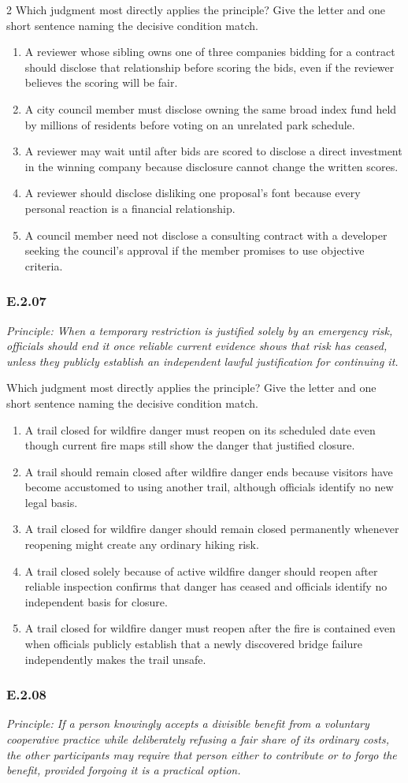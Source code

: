 \documentclass[10pt]{extarticle}
\newcommand{\choice}[1]{\item #1}
\newcommand{\bankitem}[1]{\subsubsection*{#1}}
\begin{document}
\begin{multicols}{2}
Which judgment most directly applies the principle? Give the letter and one short sentence naming the decisive condition match.
\begin{enumerate}[label=(\alph*)]
  \choice{A reviewer whose sibling owns one of three companies bidding for a contract should disclose that relationship before scoring the bids, even if the reviewer believes the scoring will be fair.}
  \choice{A city council member must disclose owning the same broad index fund held by millions of residents before voting on an unrelated park schedule.}
  \choice{A reviewer may wait until after bids are scored to disclose a direct investment in the winning company because disclosure cannot change the written scores.}
  \choice{A reviewer should disclose disliking one proposal's font because every personal reaction is a financial relationship.}
  \choice{A council member need not disclose a consulting contract with a developer seeking the council's approval if the member promises to use objective criteria.}
\end{enumerate}
\bankitem{E.2.07}
\emph{Principle: When a temporary restriction is justified solely by an emergency risk, officials should end it once reliable current evidence shows that risk has ceased, unless they publicly establish an independent lawful justification for continuing it.}

Which judgment most directly applies the principle? Give the letter and one short sentence naming the decisive condition match.
\begin{enumerate}[label=(\alph*)]
  \choice{A trail closed for wildfire danger must reopen on its scheduled date even though current fire maps still show the danger that justified closure.}
  \choice{A trail should remain closed after wildfire danger ends because visitors have become accustomed to using another trail, although officials identify no new legal basis.}
  \choice{A trail closed for wildfire danger should remain closed permanently whenever reopening might create any ordinary hiking risk.}
  \choice{A trail closed solely because of active wildfire danger should reopen after reliable inspection confirms that danger has ceased and officials identify no independent basis for closure.}
  \choice{A trail closed for wildfire danger must reopen after the fire is contained even when officials publicly establish that a newly discovered bridge failure independently makes the trail unsafe.}
\end{enumerate}
\bankitem{E.2.08}
\emph{Principle: If a person knowingly accepts a divisible benefit from a voluntary cooperative practice while deliberately refusing a fair share of its ordinary costs, the other participants may require that person either to contribute or to forgo the benefit, provided forgoing it is a practical option.}


\end{multicols}
\end{document}
